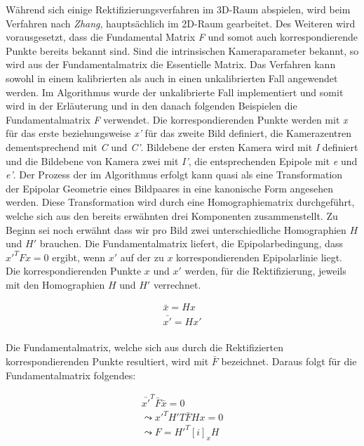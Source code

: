 Während sich einige Rektifizierungsverfahren im 3D-Raum abspielen, wird beim Verfahren nach \textit{Zhang}, hauptsächlich im 2D-Raum gearbeitet. Des Weiteren wird vorausgesetzt, dass die Fundamental Matrix \textit{F} und somot auch korrespondierende Punkte bereits bekannt sind. Sind die intrinsischen Kameraparameter bekannt, so wird aus der Fundamentalmatrix die Essentielle Matrix. Das Verfahren kann sowohl in einem kalibrierten als auch in einen unkalibrierten Fall angewendet werden\cite{ZZ}. Im Algorithmus wurde der unkalibrierte Fall implementiert und somit wird in der Erläuterung und in den danach folgenden Beispielen die Fundamentalmatrix \textit{F} verwendet. Die korrespondierenden Punkte werden mit \textit{x} für das erste beziehungsweise \textit{x'} für das zweite Bild definiert, die Kamerazentren dementsprechend mit \textit{C} und \textit{C'}. Bildebene der ersten Kamera wird mit \textit{I} definiert und die Bildebene von Kamera zwei mit \textit{I'}, die entsprechenden Epipole mit \textit{e} und \textit{e'}. Der Prozess der im Algorithmus erfolgt kann quasi als eine Transformation der Epipolar Geometrie eines Bildpaares in eine kanonische Form angesehen werden. Diese Transformation wird durch eine Homographiematrix durchgeführt, welche sich aus den bereits erwähnten drei Komponenten zusammenstellt. Zu Beginn sei noch erwähnt dass wir pro Bild zwei unterschiedliche Homographien \ensuremath{H} und \ensuremath{H'} brauchen. Die Fundamentalmatrix liefert, die Epipolarbedingung, dass $x'^TFx=0$ ergibt, wenn $x'$ auf der zu $x$ korrespondierenden Epipolarlinie liegt. Die korrespondierenden Punkte $x$ und $x'$ werden, für die Rektifizierung, jeweils mit den Homographien $H$ und $H'$ verrechnet.

\begin{gather}
	\bar{x}= Hx\\
	\bar{x'}= Hx'
\end{gather}\\

Die Fundamentalmatrix, welche sich aus durch die Rektifizierten korrespondierenden Punkte resultiert, wird mit $\bar{F}$ bezeichnet. Daraus folgt für die Fundamentalmatrix folgendes:

\begin{gather}
	\bar{x'}^T\bar{F}\bar{x} = 0\\
	\leadsto x'^TH'T\bar{F}Hx=0\\
	\leadsto F = H'^T[i]_xH
\end{gather}\\


